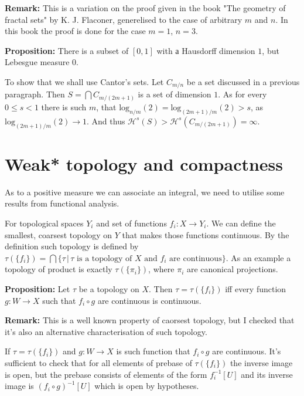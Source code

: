 \documentclass{article}
\begin{document}
\vspace{1ex}
\textbf{Remark:} This is a variation on the proof given in the book "The geometry
of fractal sets" by K. J. Flaconer, generelised to the case of arbitrary $m$ and
$n$. In this book the proof is done for the case $m=1$, $n=3$.

\vspace{1ex}
\textbf{Proposition:} There is a subset of $[0,1]$ with а Hausdorff dimension
$1$, but Lebesgue measure 0.

\vspace{1ex}
To show that we shall use Cantor's sets. Let $C_{m/n}$ be a set discussed in a
previous paragraph. Then $S=\bigcap C_{m/(2m+1)}$ is a set of dimension $1$. As
for every $0\leq s<1$ there is such $m$, that $\text{log}_{n/m}(2)=\text{log}_{
(2m+1)/m}(2)>s$, as $\text{log}_{(2m+1)/m}(2)\rightarrow 1$. And thus $\mathcal
{H}^s(S)>\mathcal{H}^s(C_{m/(2m+1)})=\infty$.

\section{Weak* topology and compactness}
As to a positive measure we can associate an integral, we need to utilise some
results from functional analysis.
\vspace{1ex}

For topological spaces $Y_i$ and set of functions $f_i:X\rightarrow Y_i$. We can
define the smallest, coarsest topology on $Y$ that makes those functions continuous.
By the definition such topology is defined by $\tau(\{f_i\})=\bigcap\{\tau\,|\,
\tau\text{ is a topology of }X\text{ and }f_i\text{ are continuous}\}$. As an
example a topology of product is exactly $\tau(\{\pi_i\})$, where $\pi_i$ are
canonical projections.
\vspace{1ex}

\textbf{Proposition:} Let $\tau$ be a topology on $X$. Then $\tau=\tau(\{f_i\})$ iff
every function $g:W\rightarrow X$ such that $f_i\circ g$ are continuous is
continuous.
\vspace{1ex}

\textbf{Remark:} This is a well known property of caorsest topology, but I
checked that it's also an alternative characterisation of such topology.

If $\tau=\tau(\{f_i\})$ and $g:W\rightarrow X$ is such function that $f_i\circ
g$ are continuous. It's sufficient to check that for all elements of prebase
of $\tau(\{f_i\})$ the inverse image is open, but the prebase consists of
elements of the form $f_i^{-1}[U]$ and its inverse image is $(f_i\circ g)^{-1}[U]$
which is open by hypotheses.
\vspace{1ex}
\end{document}
